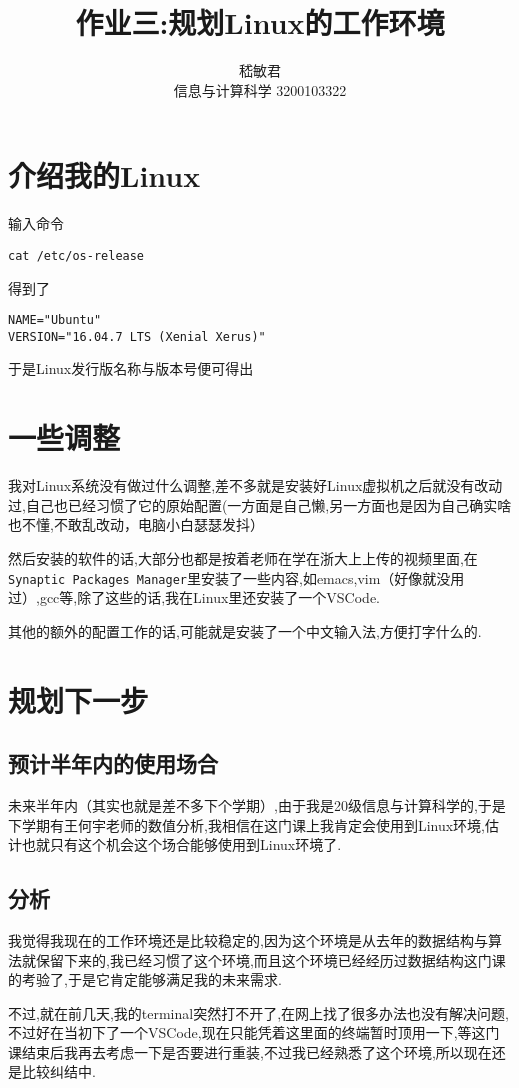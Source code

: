\documentclass{ctexart}
\title{作业三:规划Linux的工作环境}
\author{嵇敏君 \\信息与计算科学 3200103322 }
\begin{document}
\maketitle

\section{介绍我的Linux}
输入命令\cite{王唯融2017一种}
\begin{verbatim}
cat /etc/os-release
\end{verbatim}
得到了
\begin{verbatim}
NAME="Ubuntu"
VERSION="16.04.7 LTS (Xenial Xerus)"
\end{verbatim}
于是Linux发行版名称与版本号便可得出
\section{一些调整}
  我对Linux系统没有做过什么调整,差不多就是安装好Linux虚拟机之后就没有改动过,自己也已经习惯了它的原始配置(一方面是自己懒,另一方面也是因为自己确实啥也不懂,不敢乱改动，电脑小白瑟瑟发抖）

    然后安装的软件的话,大部分也都是按着老师在学在浙大上上传的视频里面,在\verb|Synaptic Packages Manager|里安装了一些内容,如emacs,vim（好像就没用过）,gcc等,除了这些的话,我在Linux里还安装了一个VSCode.

    其他的额外的配置工作的话,可能就是安装了一个中文输入法,方便打字什么的.
\section{规划下一步}
\subsection{预计半年内的使用场合}
未来半年内（其实也就是差不多下个学期）,由于我是20级信息与计算科学的,于是下学期有王何宇老师的数值分析,我相信在这门课上我肯定会使用到Linux环境,估计也就只有这个机会这个场合能够使用到Linux环境了.
\subsection{分析}
    我觉得我现在的工作环境还是比较稳定的,因为这个环境是从去年的数据结构与算法就保留下来的,我已经习惯了这个环境,而且这个环境已经经历过数据结构这门课的考验了,于是它肯定能够满足我的未来需求.

    不过,就在前几天,我的terminal突然打不开了,在网上找了很多办法也没有解决问题,不过好在当初下了一个VSCode,现在只能凭着这里面的终端暂时顶用一下,等这门课结束后我再去考虑一下是否要进行重装,不过我已经熟悉了这个环境,所以现在还是比较纠结中.
\end{document}
